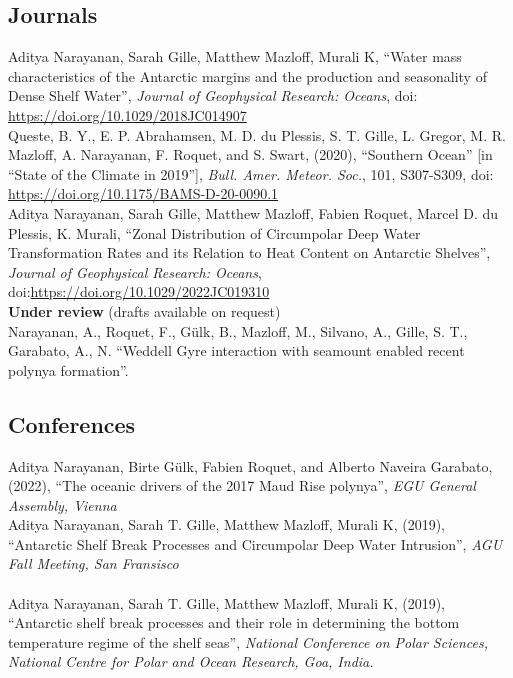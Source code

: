 \documentclass[12pt, a4paper]{article}
\newcommand{\years}[1]{\marginnote{\small #1}}
\begin{document}
\subsection*{\bf Journals}
\years{2019}Aditya Narayanan, Sarah Gille, Matthew Mazloff, Murali K, ``Water mass characteristics of the Antarctic margins and the production and seasonality of Dense Shelf Water'', \emph{Journal of Geophysical Research: Oceans}, doi: \url{https://doi.org/10.1029/2018JC014907}\\
\years{2020} Queste, B. Y., E. P. Abrahamsen, M. D. du Plessis, S. T. Gille, L. Gregor, M. R. Mazloff, A. Narayanan, F. Roquet, and S. Swart, (2020), ``Southern Ocean'' [in ``State of the Climate in 2019''], \emph{Bull. Amer. Meteor. Soc.}, 101, S307-S309, doi: \url{https://doi.org/10.1175/BAMS-D-20-0090.1}\\
\years{2023} Aditya Narayanan, Sarah Gille, Matthew Mazloff, Fabien Roquet, Marcel D. du Plessis, K. Murali, ``Zonal Distribution of Circumpolar Deep Water Transformation Rates and its Relation to Heat Content on Antarctic Shelves'', \emph{Journal of Geophysical Research: Oceans}, doi:\url{https://doi.org/10.1029/2022JC019310}\\


{\bf Under review} (drafts available on request)\\

\years{2022} Narayanan, A., Roquet, F., G\"ulk, B., Mazloff, M., Silvano, A., Gille, S. T., Garabato, A., N. ``Weddell Gyre interaction with seamount enabled recent polynya formation''.\\



\subsection*{\bf Conferences}
\years{2022}Aditya Narayanan, Birte G\"ulk, Fabien Roquet, and Alberto Naveira Garabato, (2022), ``The oceanic drivers of the 2017 Maud Rise polynya'', \emph{EGU General Assembly, Vienna}\\
\years{2019}Aditya Narayanan, Sarah T. Gille, Matthew Mazloff, Murali K, (2019), ``Antarctic Shelf Break Processes and Circumpolar Deep Water Intrusion'', \emph{AGU Fall Meeting, San Fransisco}\\
\\
\years{2019}Aditya Narayanan, Sarah T. Gille, Matthew Mazloff, Murali K, (2019), ``Antarctic shelf break processes and their role in determining the bottom temperature regime of the shelf seas'', \emph{National Conference on Polar Sciences, National Centre for Polar and Ocean Research, Goa, India.}\\
\end{document}
